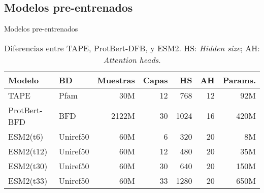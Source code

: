 \documentclass[10pt]{beamer}
\newcommand{\1}{
	\setbeamertemplate{background}{
		\texttt{[image: img/1]}
		\tikz[overlay] \fill[fill opacity=0.75,fill=white] (0,0) rectangle (-\paperwidth,\paperheight);
	}
}
\begin{document}
\subsection{Modelos pre-entrenados}

\begin{frame}{Modelos pre-entrenados}{}
	
	\begin{table}
		\centering
		\caption{Diferencias entre TAPE, ProtBert-DFB, y ESM2. HS: \textit{Hidden size}; AH: \textit{Attention heads}.}
		\label{tab:pretrained}%
		\setlength{\tabcolsep}{0.5em} %
		{\renewcommand{\arraystretch}{1.5}%
			\footnotesize
			\begin{tabular}{llrrrrr}
				
				\textbf{Modelo}   & \textbf{BD} & \textbf{Muestras} & \textbf{Capas} & \textbf{HS} & \textbf{AH} & \textbf{Params.} \\
				\hline
				TAPE             & Pfam             & 30M                   & 12              & 768                  & 12                       & 92M                 \\
				ProtBert-BFD     & BFD              & 2122M                 & 30              & 1024                 & 16                       & 420M                \\
				ESM2(t6)  & Uniref50         & 60M                   & 6               & 320                  & 20                       & 8M                  \\
				ESM2(t12)  & Uniref50         & 60M                   & 12              & 480                  & 20                       & 35M                 \\
				ESM2(t30) & Uniref50         & 60M                   & 30              & 640                  & 20                       & 150M                \\
				ESM2(t33)  & Uniref50         & 60M                   & 33              & 1280                 & 20                       & 650M               \\
				
		\end{tabular}}
		
	\end{table}
	
\end{frame}
\end{document}
